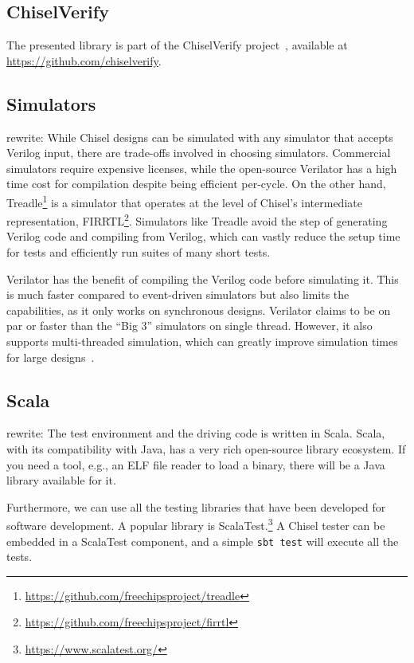 \documentclass[conference]{IEEEtran}
\newcommand{\code}[1]{{\small{\texttt{#1}}}}
\newcommand{\rewrite}[1]{{\color{red} rewrite: #1}}
\begin{document}
\subsection{ChiselVerify}

The presented library is part of the ChiselVerify project~\cite{verify:chisel:2020, dobis2021opensource}, available
at \url{https://github.com/chiselverify}.

\subsection{Simulators}

\rewrite{While Chisel designs can be simulated with any simulator that accepts Verilog input, there are trade-offs involved in choosing simulators.
Commercial simulators require expensive licenses, while the open-source Verilator has a high time cost for compilation despite being efficient per-cycle.
On the other hand, Treadle\footnote{\url{https://github.com/freechipsproject/treadle}} is a simulator that operates at the level of Chisel's intermediate representation, FIRRTL\footnote{\url{https://github.com/freechipsproject/firrtl}}.
Simulators like Treadle avoid the step of generating Verilog code and compiling from Verilog, which can vastly reduce the setup time for tests and efficiently run suites of many short tests.

Verilator has the benefit of compiling the Verilog code before simulating it. This is much faster compared to event-driven simulators but also limits the capabilities, as it only works on synchronous designs. Verilator claims to be on par or faster than the ``Big 3'' simulators on single thread. However, it also supports multi-threaded simulation, which can greatly improve simulation times for large designs~\cite{verilator}.}


\subsection{Scala}

\rewrite{The test environment and the driving code is written in Scala. Scala, with its
compatibility with Java, has a very rich open-source library ecosystem.
If you need a tool, e.g., an ELF file reader to load a binary, there will be a Java
library available for it.

Furthermore, we can use all the testing libraries that have been developed for
software development. A popular library is ScalaTest.\footnote{\url{https://www.scalatest.org/}}
A Chisel tester can be embedded
in a ScalaTest component, and a simple \code{sbt test} will execute all the tests.}
\end{document}
